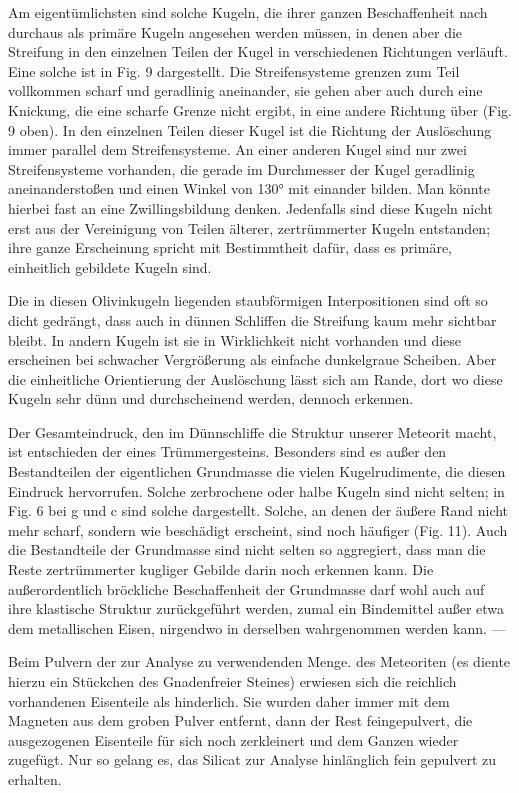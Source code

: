 \documentclass[a4paper, 11pt, oneside]{article}
\begin{document}
Am eigentümlichsten sind solche Kugeln, die ihrer ganzen Beschaffenheit nach durchaus als primäre Kugeln angesehen werden müssen, in denen aber die Streifung in den einzelnen Teilen der Kugel in verschiedenen Richtungen verläuft. Eine solche ist in Fig. 9 dargestellt. Die Streifensysteme grenzen zum Teil vollkommen scharf und geradlinig aneinander, sie gehen aber auch durch eine Knickung, die eine scharfe Grenze nicht ergibt, in eine andere Richtung über (Fig. 9 oben). In den einzelnen Teilen dieser Kugel ist die Richtung der Auslöschung immer parallel dem Streifensysteme. An einer anderen Kugel sind nur zwei Streifensysteme vorhanden, die gerade im Durchmesser der Kugel geradlinig aneinanderstoßen und einen Winkel von 130° mit einander bilden. Man könnte hierbei fast an eine Zwillingsbildung denken. Jedenfalls sind diese Kugeln nicht erst aus der Vereinigung von Teilen älterer, zertrümmerter Kugeln entstanden; ihre ganze Erscheinung spricht mit Bestimmtheit dafür, dass es primäre, einheitlich gebildete Kugeln sind.

Die in diesen Olivinkugeln liegenden staubförmigen Interpositionen sind oft so dicht gedrängt, dass auch in dünnen Schliffen die Streifung kaum mehr sichtbar bleibt. In andern Kugeln ist sie in Wirklichkeit nicht vorhanden und diese erscheinen bei schwacher Vergrößerung als einfache dunkelgraue Scheiben. Aber die einheitliche Orientierung der Auslöschung lässt sich am Rande, dort wo diese Kugeln sehr dünn und durchscheinend werden, dennoch erkennen.

Der Gesamteindruck, den im Dünnschliffe die Struktur unserer Meteorit macht, ist entschieden der eines Trümmergesteins. Besonders sind es außer den Bestandteilen der eigentlichen Grundmasse die vielen Kugelrudimente, die diesen Eindruck hervorrufen. Solche zerbrochene oder halbe Kugeln sind nicht selten; in Fig. 6 bei g und c sind solche dargestellt. Solche, an denen der äußere Rand nicht mehr scharf, sondern wie beschädigt erscheint, sind noch häufiger (Fig. 11). Auch die Bestandteile der Grundmasse sind nicht selten so aggregiert, dass man die Reste zertrümmerter kugliger Gebilde darin noch erkennen kann. Die außerordentlich bröckliche Beschaffenheit der Grundmasse darf wohl auch auf ihre klastische Struktur zurückgeführt werden, zumal ein Bindemittel außer etwa dem metallischen Eisen, nirgendwo in derselben wahrgenommen werden kann. ---

Beim Pulvern der zur Analyse zu verwendenden Menge. des Meteoriten (es diente hierzu ein Stückchen des Gnadenfreier Steines) erwiesen sich die reichlich vorhandenen Eisenteile als hinderlich. Sie wurden daher immer mit dem Magneten aus dem groben Pulver entfernt, dann der Rest feingepulvert, die ausgezogenen Eisenteile für sich noch zerkleinert und dem Ganzen wieder zugefügt. Nur so gelang es, das Silicat zur Analyse hinlänglich fein gepulvert zu erhalten.
\end{document}

